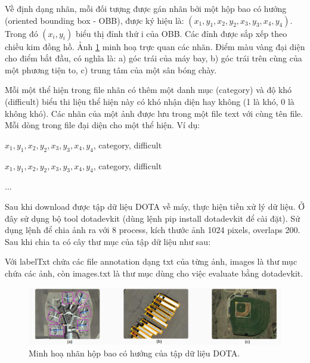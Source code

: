 \documentclass[12pt,a4paper,openany,oneside]{report}
\begin{document}
Về định dạng nhãn, mỗi đối tượng được gán nhãn bởi một hộp bao có hướng (oriented bounding box - OBB), được ký hiệu là: $(x_1, y_1, x_2, y_2, x_3, y_3, x_4, y_4)$. Trong đó $(x_i, y_i)$ biểu thị đỉnh thứ i của OBB. Các đỉnh được sắp xếp theo chiều kim đồng hồ. Ảnh \ref{minh_hoa_hop_bao_dota} minh hoạ trực quan các nhãn. Điểm màu vàng đại diện cho điểm bắt đầu, có nghĩa là: a) góc trái của máy bay, b) góc trái trên cùng của một phương tiện to, c) trung tâm của một sân bóng chày.

Mỗi một thể hiện trong file nhãn có thêm một danh mục (category) và độ khó (difficult) biểu thi liệu thể hiện này có khó nhận diện hay không (1 là khó, 0 là không khó). Các nhãn của một ảnh được lưu trong một file text với cùng tên file. Mỗi dòng trong file đại diện cho một thể hiện. Ví dụ:

$x_1, y_1, x_2, y_2, x_3, y_3, x_4, y_4$, category, difficult 

$x_1, y_1, x_2, y_2, x_3, y_3, x_4, y_4$, category, difficult 

...

Sau khi download được tập dữ liệu DOTA về máy, thực hiện tiền xử lý dữ liệu. Ở đây sử dụng bộ tool dotadevkit (dùng lệnh pip install dotadevkit để cài đặt). Sử dụng lệnh để chia ảnh ra với 8 process, kích thước ảnh 1024 pixels, overlaps 200. Sau khi chia ta có cây thư mục của tập dữ liệu như sau:


Với labelTxt chứa các file annotation dạng txt của từng ảnh, images là thư mục chứa các ảnh, còn images.txt là thư mục dùng cho việc evaluate bằng dotadevkit.
\begin{figure}[ht!]
	\begin{center}
		\includegraphics[width=445px]{./minh_hoa_hop_bao_dota.jpg}
		\caption{Minh hoạ nhãn hộp bao có hướng của tập dữ liệu DOTA.}
		\label{minh_hoa_hop_bao_dota}
	\end{center}
\end{figure} 
\end{document}
